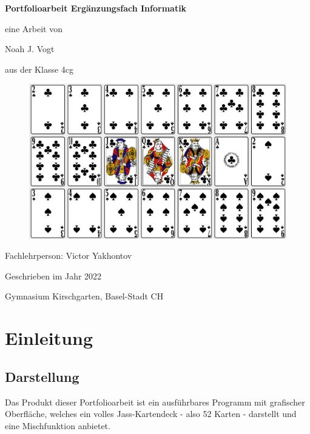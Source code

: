 \documentclass[a4paper,11pt]{article}
\begin{document}
\begin{titlepage}

	\centering

    \vspace{5cm}
    \vspace{0.1cm}
	{\huge\bfseries Portfolioarbeit Ergänzungsfach Informatik \par}
	\vspace{0.5cm}
	{\Large eine Arbeit von \par}
	{\Large Noah J. Vogt \par}
    {\Large aus der Klasse 4cg \par}
    \vspace{0.5cm}

    \begin{figure}[H]
        \centering
        \includegraphics[width=.9\textwidth]{media/card-panel.jpg}
    \end{figure}

    \vspace{0.5cm}
    {\Large Fachlehrperson: Victor Yakhontov \par }
    \vspace{0.5cm}
	{\large Geschrieben im Jahr 2022 \par}
    {\large Gymnasium Kirschgarten, Basel-Stadt CH \par}

\end{titlepage}

\tableofcontents
\pagebreak

\section{Einleitung}
\subsection{Darstellung}
Das Produkt dieser Portfolioarbeit ist ein ausführbares Programm mit grafischer Oberfläche, welches ein volles Jass-Kartendeck - also 52 Karten - darstellt und eine Mischfunktion anbietet.\\
\end{document}
